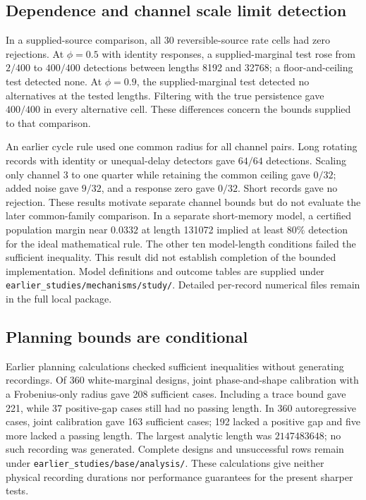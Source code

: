 \subsection{Dependence and channel scale limit detection}
In a supplied-source comparison, all 30 reversible-source rate cells had zero rejections. At $\phi=0.5$ with identity responses, a supplied-marginal test rose from $2/400$ to $400/400$ detections between lengths 8192 and 32768; a floor-and-ceiling test detected none. At $\phi=0.9$, the supplied-marginal test detected no alternatives at the tested lengths. Filtering with the true persistence gave $400/400$ in every alternative cell. These differences concern the bounds supplied to that comparison.

An earlier cycle rule used one common radius for all channel pairs. Long rotating records with identity or unequal-delay detectors gave $64/64$ detections. Scaling only channel 3 to one quarter while retaining the common ceiling gave $0/32$; added noise gave $9/32$, and a response zero gave $0/32$. Short records gave no rejection. These results motivate separate channel bounds but do not evaluate the later common-family comparison. In a separate short-memory model, a certified population margin near $0.0332$ at length 131072 implied at least 80\% detection for the ideal mathematical rule. The other ten model-length conditions failed the sufficient inequality. This result did not establish completion of the bounded implementation. Model definitions and outcome tables are supplied under \texttt{earlier\_studies/mechanisms/study/}. Detailed per-record numerical files remain in the full local package.

\subsection{Planning bounds are conditional}
Earlier planning calculations checked sufficient inequalities without generating recordings. Of 360 white-marginal designs, joint phase-and-shape calibration with a Frobenius-only radius gave 208 sufficient cases. Including a trace bound gave 221, while 37 positive-gap cases still had no passing length. In 360 autoregressive cases, joint calibration gave 163 sufficient cases; 192 lacked a positive gap and five more lacked a passing length. The largest analytic length was $2147483648$; no such recording was generated. Complete designs and unsuccessful rows remain under \texttt{earlier\_studies/base/analysis/}. These calculations give neither physical recording durations nor performance guarantees for the present sharper tests.
